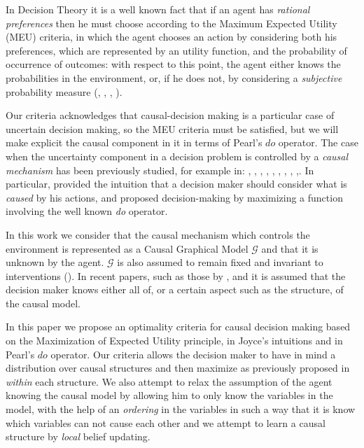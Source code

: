 \documentclass[letterpaper]{article}
\begin{document}
In Decision Theory it is a well known fact that if an agent has \textit{rational preferences} then he must choose according to the Maximum Expected Utility (MEU) criteria, in which the agent chooses an action by considering both his preferences, which are represented by an utility function, and the probability of occurrence of outcomes: with respect to this point, the agent either knows the probabilities in the environment, or, if he does not, by considering a \textit{subjective} probability measure (\cite{von1944theory}, \cite{savage1954the}, \cite{bernardo2000bayesian}, \cite{gilboa2009decision}). 

Our criteria acknowledges that causal-decision making is a particular case of uncertain decision making, so the MEU criteria must be satisfied, but we will make explicit the causal component in it in terms of Pearl's $do$ operator. The case when the uncertainty component in a decision problem is controlled by a \textit{causal mechanism} has been previously studied, for example in: \cite{joyce1999foundations}, \cite{pearl2009causality}, \cite{bottou2013counterfactual}, \cite{ortega2014generalized}, \cite{bareinboim2015bandits}, \cite{lattimoreNIPS2016}, \cite{sen2017identifying}, \cite{gonzalez2018playing}, \cite{acharya2018learning},. In particular, \cite{joyce1999foundations} provided the intuition that a decision maker should consider what is \textit{caused} by his actions, and \cite{pearl2009causality} proposed decision-making by maximizing a function involving the well known \textit{do} operator.

In this work we consider that the causal mechanism which controls the environment is represented as a Causal Graphical Model $\mathcal{G}$ and that it is unknown by the agent. $\mathcal{G}$ is also assumed to remain fixed and invariant to interventions (\cite{woodward2005making}). In recent papers, such as those by \cite{lattimoreNIPS2016}, \cite{sen2017identifying} and \cite{gonzalez2018playing} it is assumed that the decision maker knows either all of, or a certain aspect such as the structure, of the causal model.

In this paper we propose an optimality criteria for causal decision making based on the Maximization of Expected Utility principle, in Joyce's intuitions and in Pearl's $do$ operator. Our criteria allows the decision maker to have in mind a distribution over causal structures and then maximize as previously proposed in \cite{pearl2009causality} \textit{within} each structure. We also attempt to relax the assumption of the agent knowing the causal model by allowing him to only know the variables in the model, with the help of an \textit{ordering} in the variables in such a way that it is know which variables can not cause each other and we attempt to learn a causal structure by \textit{local} belief updating.
\end{document}
